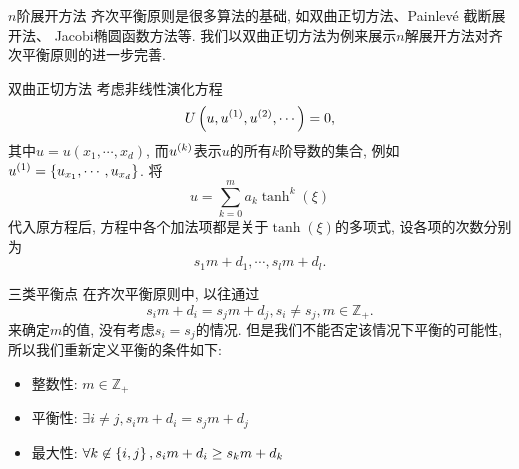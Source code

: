 \begin{frame}{$n$阶展开方法}
齐次平衡原则是很多算法的基础, 如双曲正切方法、Painlev\'e 截断展开法、 Jacobi椭圆函数方法等. 我们以双曲正切方法为例来展示$n$解展开方法对齐次平衡原则的进一步完善. 
\end{frame}




\begin{frame}{双曲正切方法}
考虑非线性演化方程 
\[
    U\left(u,u^{(1)},u^{(2)},\cdots\right)=0, 
\]
其中$u=u(x_1,\cdots,x_d)$, 而$u^{(k)}$表示$u$的所有$k$阶导数的集合, 例如$u^{(1)}=\left\{u_{x_1},\cdots,u_{x_d}\right\}$. 
将
\[
    u=\sum_{k=0}^{m}{a_k\tanh^k(\xi)}
\]
代入原方程后, 方程中各个加法项都是关于$\tanh(\xi)$的多项式, 设各项的次数分别为 
\[
    s_1 m+d_1,\cdots,s_l m + d_l . 
\]
\end{frame}

\begin{frame}{三类平衡点}
在齐次平衡原则中, 以往通过
\[
    s_i m+d_i=s_j m+d_j, s_i\neq s_j , m\in \mathbb Z_+. 
\]
来确定$m$的值, 没有考虑$s_i=s_j$的情况. 但是我们不能否定该情况下平衡的可能性, 所以我们重新定义平衡的条件如下:
\begin{itemize}
    \item 整数性: $ m\in \mathbb Z_+$ 
    \item 平衡性: $\exists i\neq j, s_i m+d_i=s_j m+d_j $
    \item 最大性: $\forall k \not\in \left\{i,j\right\}, s_i m+d_i\ge s_k m+d_k $
\end{itemize}
\end{frame}

